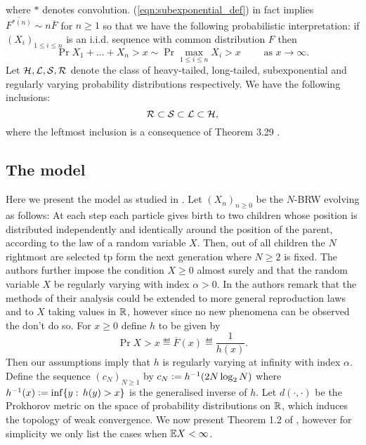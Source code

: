 where $*$ denotes convolution. (\ref{eqn:subexponential_def}) in fact implies $\overline{F^{* (n)}} \sim n \overline{F}$ for $n \geq 1$ so that we have the following probabilistic interpretation: if $(X_i)_{1 \leq i \leq n}$ is an i.i.d. sequence with common distribution $F$ then 
\begin{equation}
\Pr{X_1 + ... + X_n > x} \sim \Pr{\max\limits_{1 \leq i \leq n} X_i > x} \qquad\text{ as } x \to \infty. 
\end{equation}
Let $\cal{H}, \cal{L}, \cal{S}, \cal{R}$ denote the class of heavy-tailed, long-tailed, subexponential and regularly varying probability distributions respectively. We have the following inclusions:
\begin{equation}
\cal{R} \subset \cal{S} \subset \cal{L} \subset \cal{H}, 
\end{equation}
where the leftmost inclusion is a consequence of Theorem 3.29 \cite{foss2011introduction}. 








\subsection{The model}
Here we present the model as studied in \cite{poly_tails}. Let $(X_n)_{n \geq 0}$ be the $N$-BRW evolving as follows: At each step each particle gives birth to two children whose position is distributed independently and identically around the position of the parent, according to the law of a random variable $X$. Then, out of all children the $N$ rightmost are selected tp form the next generation where $N \geq 2$ is fixed. The authors further impose the condition $X \geq 0$ almost surely and that the random variable $X$ be regularly varying with index $\alpha > 0$. In \cite{poly_tails} the authors remark that the methods of their analysis could be extended to more general reproduction laws and to $X$ taking values in $\R$, however since no new phenomena can be observed the don't do so. For $x \geq 0$ define $h$ to be given by
\begin{equation}
\Pr{X > x} \eqdef \overline{F}(x) \eqdef \frac{1}{h(x)}. 
\end{equation} 
Then our assumptions imply that $h$ is regularly varying at infinity with index $\alpha$. Define the sequence $(c_N)_{N \geq 1}$ by $c_N \defeq h^{-1} (2N \log_2 N)$ where $h^{-1}(x) \defeq \inf\{ y :\, h(y) > x\}$ is the generalised inverse of $h$. Let $d(\cdot, \cdot)$ be the Prokhorov metric on the space of probability distributions on $\R$, which induces the topology of weak convergence. We now present Theorem 1.2 of \cite{poly_tails}, however for simplicity we only list the cases when $\E X < \infty$. 

